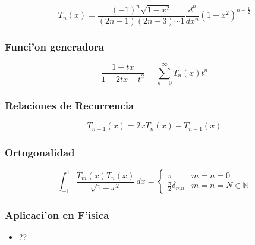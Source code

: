 \begin{equation}
T_{n}(x)=\frac{(-1)^{n}\sqrt{1-x^{2}}}{(2n-1)(2n-3)\cdots 1} \frac{d^{n}}{dx^{n}}(1-x^{2})^{n-\frac{1}{2}}
\end{equation}

\subsubsection{Funci'on generadora}

\begin{equation}
\frac{1-tx}{1-2tx+t^{2}}=\sum_{n=0}^{\infty}T_{n}(x)t^{n}
\end{equation}

\subsubsection{Relaciones de Recurrencia}

\begin{equation}
T_{n+1}(x)=2xT_{n}(x)-T_{n-1}(x)
\end{equation}

\subsubsection{Ortogonalidad}

\begin{equation}
\int_{-1}^{1}\frac{T_{m}(x)T_{n}(x)}{\sqrt{1-x^{2}}}\,dx= \left\{\begin{array}{ll}\pi & m=n=0\\ \frac{\pi}{2}\delta_{mn} & m=n=N \in \mathbb{N} \end{array}\right.
\end{equation}

\subsubsection{Aplicaci'on en F'isica}
\begin{itemize}
\item ??
\end{itemize}